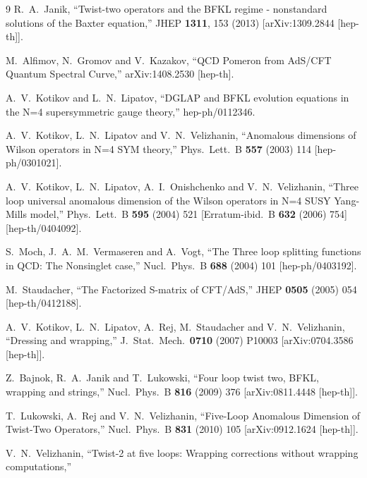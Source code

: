 \documentclass[a4paper,11pt]{article}
\numberwithin{equation}{section}
\begin{document}
\begin{thebibliography} {9}
  R.~A.~Janik,
  ``Twist-two operators and the BFKL regime - nonstandard solutions of the Baxter equation,''
  JHEP {\bf 1311}, 153 (2013)
  [arXiv:1309.2844 [hep-th]].

  M.~Alfimov, N.~Gromov and V.~Kazakov,
  ``QCD Pomeron from AdS/CFT Quantum Spectral Curve,''
  arXiv:1408.2530 [hep-th].

  A.~V.~Kotikov and L.~N.~Lipatov,
  ``DGLAP and BFKL evolution equations in the N=4 supersymmetric gauge theory,''
  hep-ph/0112346.

  A.~V.~Kotikov, L.~N.~Lipatov and V.~N.~Velizhanin,
  ``Anomalous dimensions of Wilson operators in N=4 SYM theory,''
  Phys.\ Lett.\ B {\bf 557} (2003) 114
  [hep-ph/0301021].

  A.~V.~Kotikov, L.~N.~Lipatov, A.~I.~Onishchenko and V.~N.~Velizhanin,
  ``Three loop universal anomalous dimension of the Wilson operators in N=4 SUSY Yang-Mills model,''
  Phys.\ Lett.\ B {\bf 595} (2004) 521
   [Erratum-ibid.\ B {\bf 632} (2006) 754]
  [hep-th/0404092].

  S.~Moch, J.~A.~M.~Vermaseren and A.~Vogt,
  ``The Three loop splitting functions in QCD: The Nonsinglet case,''
  Nucl.\ Phys.\ B {\bf 688} (2004) 101
  [hep-ph/0403192].

  M.~Staudacher,
  ``The Factorized S-matrix of CFT/AdS,''
  JHEP {\bf 0505} (2005) 054
  [hep-th/0412188].

  A.~V.~Kotikov, L.~N.~Lipatov, A.~Rej, M.~Staudacher and V.~N.~Velizhanin,
  ``Dressing and wrapping,''
  J.\ Stat.\ Mech.\  {\bf 0710} (2007) P10003
  [arXiv:0704.3586 [hep-th]].

  Z.~Bajnok, R.~A.~Janik and T.~Lukowski,
  ``Four loop twist two, BFKL, wrapping and strings,''
  Nucl.\ Phys.\ B {\bf 816} (2009) 376
  [arXiv:0811.4448 [hep-th]].

  T.~Lukowski, A.~Rej and V.~N.~Velizhanin,
  ``Five-Loop Anomalous Dimension of Twist-Two Operators,''
  Nucl.\ Phys.\ B {\bf 831} (2010) 105
  [arXiv:0912.1624 [hep-th]].

  V.~N.~Velizhanin,
  ``Twist-2 at five loops: Wrapping corrections without wrapping computations,''


\end{thebibliography}
\end{document}
